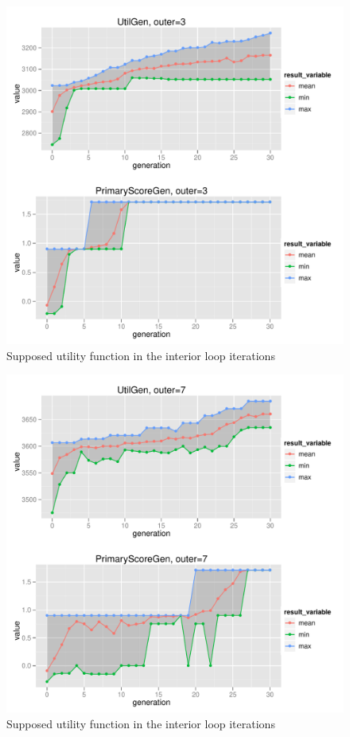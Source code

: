\begin{figure}
  \centering \includegraphics[width=1.0\textwidth]{exp/nouncert/c2_utilgen_03}
  \caption{Supposed utility function in the interior loop iterations}
  \label{c2_utilgen_03}
\end{figure}

\begin{figure}
  \centering \includegraphics[width=1.0\textwidth]{exp/nouncert/c2_utilgen_07}
  \caption{Supposed utility function in the interior loop iterations}
  \label{c2_utilgen_07}
\end{figure}

